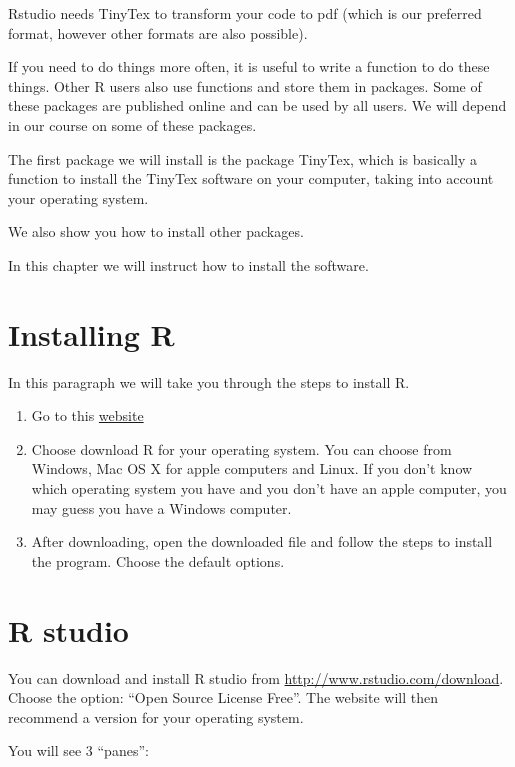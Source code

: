 \documentclass[
]{book}
\providecommand{\tightlist}{%
  \setlength{\itemsep}{0pt}\setlength{\parskip}{0pt}}
\begin{document}
Rstudio needs TinyTex to transform your code to pdf (which is our preferred format, however other formats are also possible).

If you need to do things more often, it is useful to write a function to do these things. Other R users also use functions and store them in packages. Some of these packages are published online and can be used by all users. We will depend in our course on some of these packages.

The first package we will install is the package TinyTex, which is basically a function to install the TinyTex software on your computer, taking into account your operating system.

We also show you how to install other packages.

In this chapter we will instruct how to install the software.

\hypertarget{installing-r}{%
\section{Installing R}\label{installing-r}}

In this paragraph we will take you through the steps to install R.

\begin{enumerate}
\def\labelenumi{\arabic{enumi}.}
\tightlist
\item
  Go to this \href{https://mirror.lyrahosting.com/CRAN/}{website}
\item
  Choose download R for your operating system. You can choose from Windows, Mac OS X for apple computers and Linux. If you don't know which operating system you have and you don't have an apple computer, you may guess you have a Windows computer.
\item
  After downloading, open the downloaded file and follow the steps to install the program. Choose the default options.
\end{enumerate}

\hypertarget{r-studio}{%
\section{R studio}\label{r-studio}}

You can download and install R studio from \url{http://www.rstudio.com/download}. Choose the option: ``Open Source License Free''. The website will then recommend a version for your operating system.

You will see 3 ``panes'':
\end{document}
